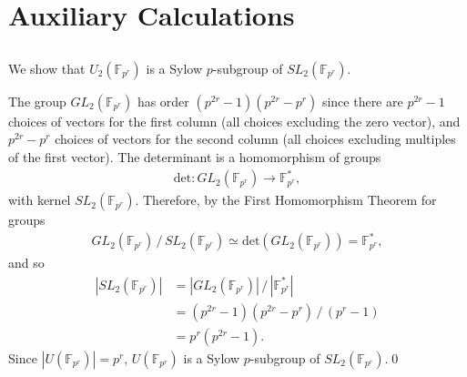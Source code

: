 
\chapter{Auxiliary Calculations}
\label{AppendixA}

\section{} \label{u_sylow}
We show that $U_2(\mathbb{F}_{p^r})$ is a Sylow $p$-subgroup of $SL_2(\mathbb{F}_{p^r})$.

The group $GL_2(\mathbb{F}_{p^r})$ has order $(p^{2r} - 1)(p^{2r} - p^r)$ since there are $p^{2r} - 1$ choices of vectors for the first column (all choices excluding the zero vector), and $p^{2r} - p^r$ choices of vectors for the second column (all choices excluding multiples of the first vector). The determinant is a homomorphism of groups
	\begin{align*}
		\mathrm{det}:GL_2(\mathbb{F}_{p^r}) \rightarrow \mathbb{F}^*_{p^r},
	\end{align*}
	with kernel $SL_2(\mathbb{F}_{p^r})$. Therefore, by the First Homomorphism Theorem for groups
	\begin{align*}
		GL_2(\mathbb{F}_{p^r})\,/\,SL_2(\mathbb{F}_{p^r}) \simeq \mathrm{det}(GL_2(\mathbb{F}_{p^r})) = \mathbb{F}^*_{p^r},
	\end{align*}
	and so
	\begin{align*}
		|SL_2(\mathbb{F}_{p^r})|
		&=  |GL_2(\mathbb{F}_{p^r})|\,/\,|\mathbb{F}^*_{p^r}|\\
		&=  (p^{2r} - 1)(p^{2r} - p^r)\,/\,(p^r - 1)\\
		&=  p^r(p^{2r} - 1).
	\end{align*}
	Since $|U(\mathbb{F}_{p^r})| = p^r$, $U(\mathbb{F}_{p^r})$ is a Sylow $p$-subgroup of $SL_2(\mathbb{F}_{p^r})$.\qed
